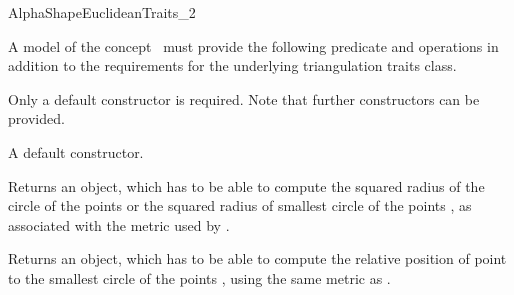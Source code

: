\begin{ccRefConcept} {AlphaShapeEuclideanTraits_2}


\ccDefinition
A model of the concept \ccRefName\  must provide the following predicate and
operations in addition to the requirements for the underlying triangulation
traits class.

\ccRefines
{}

\ccTypes


\ccCreation

Only a default constructor is required. Note that further constructors
can be provided. 

{A default constructor.}


{Returns an object, which has to be able to compute the squared radius of the
circle of the points  or the squared radius of smallest  circle
of the points , as  associated with the metric used
by .} 


{Returns an object, which has to be able to compute the relative position of
point  to the smallest circle of the points , using the
same metric as .}

\end{ccRefConcept}


